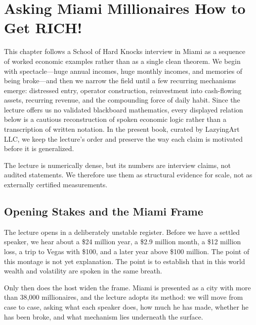 \chapter{Asking Miami Millionaires How to Get RICH!}

This chapter follows a School of Hard Knocks interview in Miami as a sequence of worked economic examples rather than as a single clean theorem. We begin with spectacle---huge annual incomes, huge monthly incomes, and memories of being broke---and then we narrow the field until a few recurring mechanisms emerge: distressed entry, operator construction, reinvestment into cash-flowing assets, recurring revenue, and the compounding force of daily habit. Since the lecture offers us no validated blackboard mathematics, every displayed relation below is a cautious reconstruction of spoken economic logic rather than a transcription of written notation. In the present book, curated by LazyingArt LLC, we keep the lecture's order and preserve the way each claim is motivated before it is generalized.

\begin{remark}
The lecture is numerically dense, but its numbers are interview claims, not audited statements. We therefore use them as structural evidence for scale, not as externally certified measurements.
\end{remark}

\section{Opening Stakes and the Miami Frame}

The lecture opens in a deliberately unstable register. Before we have a settled speaker, we hear about a \$24 million year, a \$2.9 million month, a \$12 million loss, a trip to Vegas with \$100, and a later year above \$100 million. The point of this montage is not yet explanation. The point is to establish that in this world wealth and volatility are spoken in the same breath.

Only then does the host widen the frame. Miami is presented as a city with more than 38{,}000 millionaires, and the lecture adopts its method: we will move from case to case, asking what each speaker does, how much he has made, whether he has been broke, and what mechanism lies underneath the surface.

